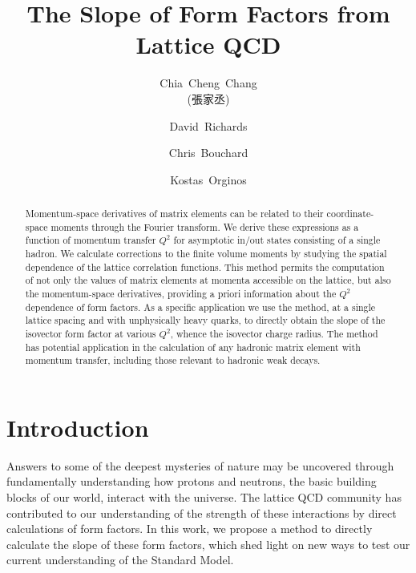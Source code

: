 \documentclass[prd,aps,twocolumn,superscriptaddress,tightenlines,nofootinbib,floatfix,preprintnumbers,10pt]{revtex4-1}
\newcommand{\mydate}{\ \today \ - \number\hour :\number\minute}
\begin{document}
\title{The Slope of Form Factors from Lattice QCD}

\author{Chia~Cheng~Chang \begin{CJK*}{UTF8}{bsmi}(張家丞)\end{CJK*}}
\affiliation{\lblnsd}

\author{David~Richards}
\affiliation{\jlab}

\author{Chris~Bouchard}
\affiliation{\glasgow}

\author{Kostas~Orginos}
\affiliation{\wm}
\affiliation{\jlab}





\begin{abstract}
Momentum-space derivatives of matrix elements can be related to their
coordinate-space moments through the Fourier transform. We derive
these expressions as a function of momentum transfer $Q^2$ for
asymptotic in/out states consisting of a single hadron. We calculate
corrections to the finite volume moments by studying the spatial
dependence of the lattice correlation functions. This method permits
the computation of not only the values of matrix elements at momenta
accessible on the lattice, but also the momentum-space derivatives,
providing a priori information about the $Q^2$ dependence of form
factors. As a specific application we use the method, at a single
lattice spacing and with unphysically heavy quarks, to directly obtain
the slope of the isovector form factor at various $Q^2$, whence the
isovector charge radius. The method has potential application in the
calculation of any hadronic matrix element with momentum transfer,
including those relevant to hadronic weak decays.
\end{abstract}
\maketitle



\section{Introduction\label{sec:intro}}
Answers to some of the deepest mysteries of nature may be uncovered
through fundamentally understanding how protons and neutrons, the
basic building blocks of our world, interact with the universe. The
lattice QCD community has contributed to our understanding of the
strength of these interactions by direct calculations of form
factors. In this work, we propose a method to directly calculate the
slope of these form factors, which shed light on new ways to test our
current understanding of the Standard Model.
\end{document}
